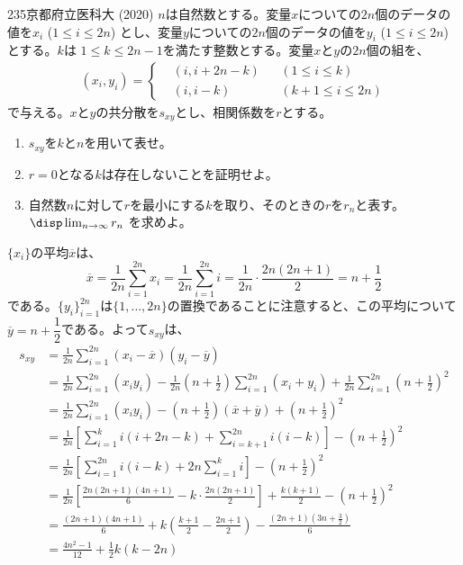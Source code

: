\begin{thm}{235}{}{京都府立医科大 (2020)}
 $n$は自然数とする。変量$x$についての$2n$個のデータの値を$x_i$ ($1\le i\le 2n$) とし、変量$y$についての$2n$個のデータの値を$y_i$ ($1\le i\le 2n$) とする。$k$は $1\le k\le 2n-1$を満たす整数とする。変量$x$と$y$の$2n$個の組を、
 \begin{align*}
  (x_i,y_i)=\left\{
  \begin{aligned}
   &(i,i+2n-k) & &(1\le i\le k) \\
   &(i,i-k) & &(k+1\le i\le 2n)
  \end{aligned}
  \right.
 \end{align*}
 で与える。$x$と$y$の共分散を$s_{xy}$とし、相関係数を$r$とする。
 \begin{enumerate}
  \item $s_{xy}$を$k$と$n$を用いて表せ。
  \item $r=0$となる$k$は存在しないことを証明せよ。
  \item 自然数$n$に対して$r$を最小にする$k$を取り、そのときの$r$を$r_n$と表す。$\disp \lim_{n\to\infty} r_n$ を求めよ。
 \end{enumerate}
\end{thm}

$\{x_i\}$の平均$\overline{x}$は、
\[ \overline{x}=\frac{1}{2n}\sum_{i=1}^{2n}x_i=\frac{1}{2n}\sum_{i=1}^{2n}i=\frac{1}{2n}\cdot\frac{2n(2n+1)}{2}=n+\frac{1}{2} \]
である。$\{y_i\}_{i=1}^{2n}$は$\{1,\dots,2n\}$の置換であることに注意すると、この平均について$\overline{y}=n+\dfrac{1}{2}$である。よって$s_{xy}$は、
\footnotesize
\begin{align*}
 s_{xy}&=\frac{1}{2n}\sum_{i=1}^{2n}(x_i-\overline{x})(y_i-\overline{y}) \\
 &=\frac{1}{2n}\sum_{i=1}^{2n}(x_iy_i)-\frac{1}{2n}\left(n+\frac{1}{2}\right)\sum_{i=1}^{2n}(x_i+y_i)+\frac{1}{2n}\sum_{i=1}^{2n}\left(n+\frac{1}{2}\right)^2 \\
 &=\frac{1}{2n}\sum_{i=1}^{2n}(x_iy_i)-\left(n+\frac{1}{2}\right)(\overline{x}+\overline{y})+\left(n+\frac{1}{2}\right)^2 \\
 &=\frac{1}{2n}\left[\sum_{i=1}^ki(i+2n-k)+\sum_{i=k+1}^{2n}i(i-k)\right]-\left(n+\frac{1}{2}\right)^2 \\
 &=\frac{1}{2n}\left[\sum_{i=1}^{2n}i(i-k)+2n\sum_{i=1}^ki\right]-\left(n+\frac{1}{2}\right)^2 \\
 &=\frac{1}{2n}\left[\frac{2n(2n+1)(4n+1)}{6}-k\cdot\frac{2n(2n+1)}{2}\right]+\frac{k(k+1)}{2}-\left(n+\frac{1}{2}\right)^2 \\
 &=\frac{(2n+1)(4n+1)}{6}+k\left(\frac{k+1}{2}-\frac{2n+1}{2}\right)-\frac{(2n+1)(3n+\frac{3}{2})}{6} \\
 &=\frac{4n^2-1}{12}+\frac{1}{2}k(k-2n)
\end{align*}
\normalsize

